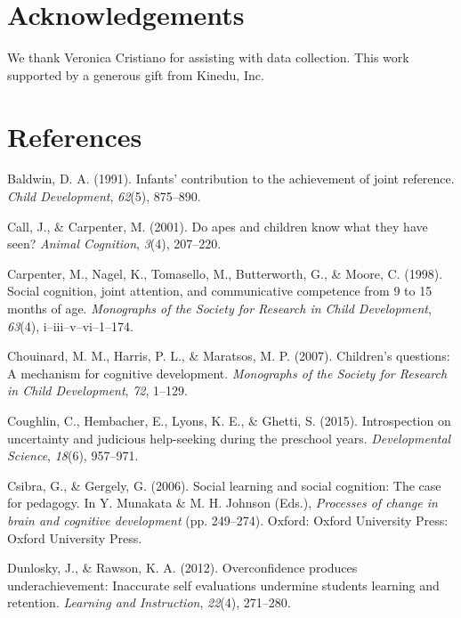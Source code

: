 \documentclass[10pt, letterpaper]{article}
\begin{document}
\section{Acknowledgements}\label{acknowledgements}

We thank Veronica Cristiano for assisting with data collection. This
work supported by a generous gift from Kinedu, Inc.

\section{References}\label{references}

\setlength{\parindent}{-0.1in} \setlength{\leftskip}{0.125in} \noindent

\hypertarget{refs}{}
\hypertarget{ref-Baldwin1991}{}
Baldwin, D. A. (1991). Infants' contribution to the achievement of joint
reference. \emph{Child Development}, \emph{62}(5), 875--890.

\hypertarget{ref-Call2001}{}
Call, J., \& Carpenter, M. (2001). Do apes and children know what they
have seen? \emph{Animal Cognition}, \emph{3}(4), 207--220.

\hypertarget{ref-Carpenter1998}{}
Carpenter, M., Nagel, K., Tomasello, M., Butterworth, G., \& Moore, C.
(1998). Social cognition, joint attention, and communicative competence
from 9 to 15 months of age. \emph{Monographs of the Society for Research
in Child Development}, \emph{63}(4), i--iii--v--vi--1--174.

\hypertarget{ref-Chouinard2007}{}
Chouinard, M. M., Harris, P. L., \& Maratsos, M. P. (2007). Children's
questions: A mechanism for cognitive development. \emph{Monographs of
the Society for Research in Child Development}, \emph{72}, 1--129.

\hypertarget{ref-Coughlin2015}{}
Coughlin, C., Hembacher, E., Lyons, K. E., \& Ghetti, S. (2015).
Introspection on uncertainty and judicious help-seeking during the
preschool years. \emph{Developmental Science}, \emph{18}(6), 957--971.

\hypertarget{ref-Csibra2006}{}
Csibra, G., \& Gergely, G. (2006). Social learning and social cognition:
The case for pedagogy. In Y. Munakata \& M. H. Johnson (Eds.),
\emph{Processes of change in brain and cognitive development} (pp.
249--274). Oxford: Oxford University Press: Oxford University Press.

\hypertarget{ref-Dunlosky2012}{}
Dunlosky, J., \& Rawson, K. A. (2012). Overconfidence produces
underachievement: Inaccurate self evaluations undermine students
learning and retention. \emph{Learning and Instruction}, \emph{22}(4),
271--280.
\end{document}
